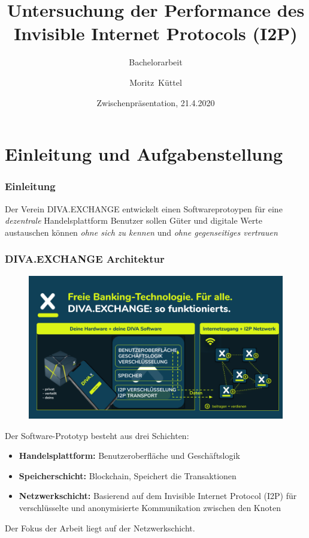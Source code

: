 \documentclass{beamer}
\title %
{Untersuchung der Performance des Invisible Internet Protocols (I2P)}
\subtitle{Bachelorarbeit}
\author[mkuettel] %
{Moritz~Küttel}
\institute[Hochschule Luzern Informatik] %
{
  Hochschule Luzern Informatik\newline
  \and
  in Zusammenarbeit mit
  \and
  DIVA.EXCHANGE
}
\date[21.4.2021] %
{Zwischenpräsentation, 21.4.2020}
\begin{document}
    \begin{frame}
        \maketitle
    \end{frame}

\section{Einleitung und Aufgabenstellung}
    \begin{frame}
        \frametitle{Einleitung}
        \begin{center}
            Der Verein DIVA.EXCHANGE entwickelt einen Softwareprotoypen für eine \textit{dezentrale} Handelsplattform
            \vfill
            Benutzer sollen Güter und digitale Werte austauschen können
            \vfill
            \textit{ohne sich zu kennen}
            \vfill
            und
            \vfill
            \textit{ohne gegenseitiges vertrauen}
        \end{center}
    \end{frame}




    \begin{frame}[allowframebreaks]
        \frametitle{DIVA.EXCHANGE Architektur}

        \begin{figure}[thp!]
            \includegraphics[width=1.0\textwidth]{img/divax-overview.png}
        \end{figure}


        Der Software-Prototyp besteht aus drei Schichten:

        \begin{itemize}
            \item \textbf{Handelsplattform:} Benutzeroberfläche und Geschäftslogik
            \item \textbf{Speicherschicht:} Blockchain, Speichert die Transaktionen
            \item \textbf{Netzwerkschicht:} Basierend auf dem Invisible Internet Protocol (I2P) für verschlüsselte und anonymisierte Kommunikation zwischen den Knoten
        \end{itemize}

        Der Fokus der Arbeit liegt auf der Netzwerkschicht.
    \end{frame}
\end{document}
